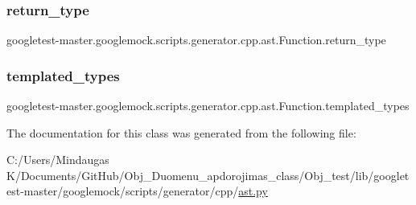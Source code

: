 \subsubsection{\texorpdfstring{return\_type}{return\_type}}
{\footnotesize\ttfamily googletest-\/master.\+googlemock.\+scripts.\+generator.\+cpp.\+ast.\+Function.\+return\+\_\+type}

\mbox{\label{classgoogletest-master_1_1googlemock_1_1scripts_1_1generator_1_1cpp_1_1ast_1_1_function_affaa64164d51cbedc6750e856375963a}} 
\subsubsection{\texorpdfstring{templated\_types}{templated\_types}}
{\footnotesize\ttfamily googletest-\/master.\+googlemock.\+scripts.\+generator.\+cpp.\+ast.\+Function.\+templated\+\_\+types}



The documentation for this class was generated from the following file\+:\begin{DoxyCompactItemize}
\item 
C\+:/\+Users/\+Mindaugas K/\+Documents/\+Git\+Hub/\+Obj\+\_\+\+Duomenu\+\_\+apdorojimas\+\_\+class/\+Obj\+\_\+test/lib/googletest-\/master/googlemock/scripts/generator/cpp/\mbox{\hyperlink{_obj__test_2lib_2googletest-master_2googlemock_2scripts_2generator_2cpp_2ast_8py}{ast.\+py}}\end{DoxyCompactItemize}
